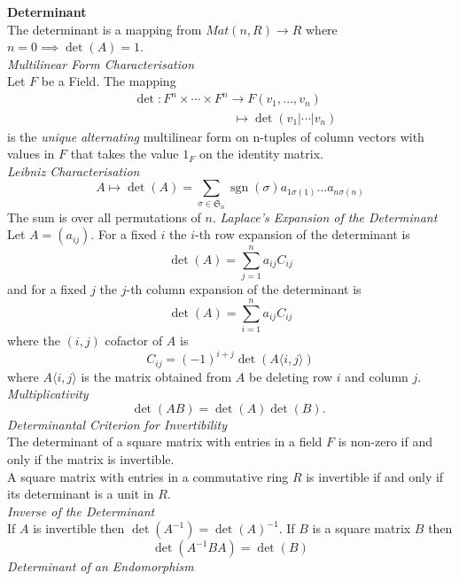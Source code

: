 \documentclass[a4paper, 10pt]{article}
\begin{document}
\begin{multicols*}{3}
\textbf{Determinant}\\
The determinant is a mapping from $Mat(n,R)\rightarrow R$ where $n=0\implies \det(A) = 1$.\\
\textit{Multilinear Form Characterisation}\\
Let $F$ be a Field. The mapping
\begin{align*}
&\operatorname{det}: F^n \times \cdots \times F^n \rightarrow F\left(v_1, \ldots, v_n\right) \\
&\qquad\qquad\qquad\qquad\mapsto \operatorname{det}\left(v_1|\cdots| v_n\right)
\end{align*}
is the \textit{unique} \textit{alternating} multilinear form on n-tuples of column vectors with values in $F$ that takes the value $1_F$ on the identity matrix.\\
\textit{Leibniz Characterisation}\\
\[
A \mapsto \operatorname{det}(A)=\sum_{\sigma \in \mathfrak{S}_n} \operatorname{sgn}(\sigma) a_{1 \sigma(1)} \ldots a_{n \sigma(n)}
\]
The sum is over all permutations of $n$.
\textit{Laplace’s Expansion of the Determinant}\\
Let $A=\left(a_{i j}\right)$. For a fixed $i$ the $i$-th row expansion of the determinant is
\[
\operatorname{det}(A)=\sum_{j=1}^n a_{i j} C_{i j}
\]
and for a fixed $j$ the $j$-th column expansion of the determinant is
\[
\operatorname{det}(A)=\sum_{i=1}^n a_{i j} C_{i j}
\]
where the $(i, j)$ cofactor of $A$ is $$C_{i j}=(-1)^{i+j} \operatorname{det}(A\langle i, j\rangle)$$ where $A\langle i, j\rangle$ is the matrix obtained from $A$ be deleting row $i$ and column $j$.\\
\textit{Multiplicativity}\\
\[
\operatorname{det}(A B)=\operatorname{det}(A) \operatorname{det}(B) \text {. }
\]
\textit{Determinantal Criterion for Invertibility} \\
The determinant of a square matrix with entries in a field $F$ is non-zero if and only if the matrix is invertible. \\
A square matrix with entries in a commutative ring $R$ is invertible if and only if its determinant is a unit in $R$. \\
\textit{Inverse of the Determinant}\\
If $A$ is invertible then $\operatorname{det}\left(A^{-1}\right)=\operatorname{det}(A)^{-1}$. 
If $B$ is a square matrix $B$ then
\[
\operatorname{det}\left(A^{-1} B A\right)=\operatorname{det}(B)
\]
\textit{Determinant of an Endomorphism}\\

\end{multicols*}
\end{document}

